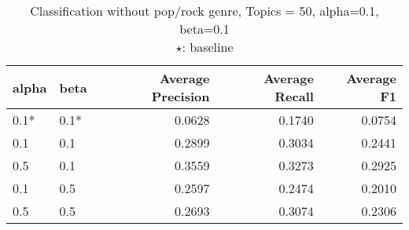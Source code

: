\begin{table}[h]
\centering
\begin{tabular}{|l|l|r|r|r|}

\hline
\textbf{alpha} & \textbf{beta} &  \textbf{Average Precision} & \textbf{Average Recall} & \textbf{Average F1} \\
\hline
0.1* & 0.1* & 0.0628&  0.1740 &	0.0754\\
0.1 & 0.1 & 0.2899 	&0.3034 &	0.2441\\
0.5 & 0.1 & 0.3559	& 0.3273	& 0.2925\\
0.1 & 0.5 & 0.2597 & 	0.2474 & 	0.2010\\
0.5 & 0.5	&	0.2693 &	0.3074 &	0.2306\\
\hline
\end{tabular}
\caption{Classification without pop/rock genre, Topics = 50, alpha=0.1, beta=0.1\\$\star$: baseline}
\end{table}